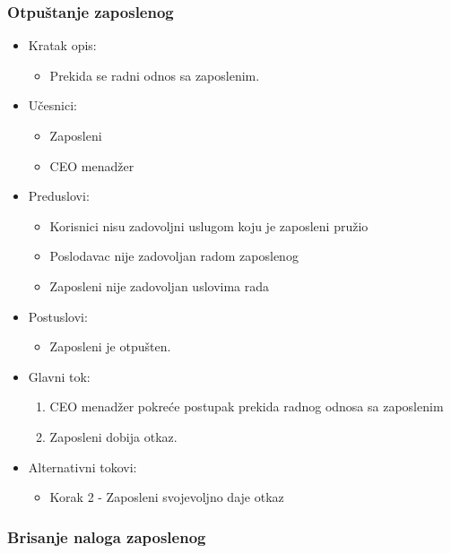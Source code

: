 \documentclass[a4paper]{article}
\begin{document}
\subsubsection{Otpuštanje zaposlenog}

\begin{itemize}
    \item Kratak opis: 
    \begin{itemize}
        \item Prekida se radni odnos sa zaposlenim.
    \end{itemize}
    \item Učesnici:
        \begin{itemize}
        \item Zaposleni
        \item CEO menadžer
    \end{itemize}
    \item Preduslovi:
        \begin{itemize}
            \item Korisnici nisu zadovoljni uslugom koju je zaposleni pružio
            \item Poslodavac nije zadovoljan radom zaposlenog
            \item Zaposleni nije zadovoljan uslovima rada
        \end{itemize}
    \item Postuslovi:
        \begin{itemize}
            \item Zaposleni je otpušten.
        \end{itemize}
    \item Glavni tok:
        \begin{enumerate}
            \item CEO menadžer pokreće postupak prekida radnog odnosa sa zaposlenim
            \item Zaposleni dobija otkaz.
        \end{enumerate}
    \item Alternativni tokovi:
        \begin{itemize}
            \item Korak 2 - Zaposleni svojevoljno daje otkaz
        \end{itemize}
\end{itemize}

\subsubsection{Brisanje naloga zaposlenog}
\end{document}
